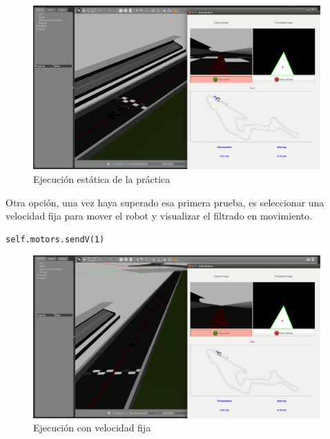 \begin{figure}[H]
  \begin{center}
    \includegraphics[width=0.98\textwidth]{figures/ejec_estat_chrono.png}
		\caption{Ejecución estática de la práctica}
		\label{fig.eech}
		\end{center}
\end{figure}

Otra opción, una vez haya superado esa primera prueba, es seleccionar una velocidad fija para mover el robot y visualizar el filtrado en movimiento.

\lstset{language=Python, breaklines=true, basicstyle=\footnotesize}
\begin{lstlisting}[frame=single]
self.motors.sendV(1)
\end{lstlisting}

\begin{figure}[H]
  \begin{center}
    \includegraphics[width=0.98\textwidth]{figures/ejec_semiestat_chrono.png}
		\caption{Ejecución con velocidad fija}
		\label{fig.esech}
		\end{center}
\end{figure}

